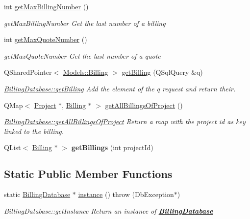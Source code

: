 \begin{DoxyCompactItemize}
int \hyperlink{classDatabases_1_1BillingDatabase_a57e4b68cac145ba400d408698312599b}{get\-Max\-Billing\-Number} ()
\begin{DoxyCompactList}\small\item\em get\-Max\-Billing\-Number Get the last number of a billing \end{DoxyCompactList}\item 
int \hyperlink{classDatabases_1_1BillingDatabase_a91704d31741279aacf9a9903b7ebcbf5}{get\-Max\-Quote\-Number} ()
\begin{DoxyCompactList}\small\item\em get\-Max\-Quote\-Number Get the last number of a quote \end{DoxyCompactList}\item 
Q\-Shared\-Pointer$<$ \hyperlink{classModels_1_1Billing}{Models\-::\-Billing} $>$ \hyperlink{classDatabases_1_1BillingDatabase_a2e6c6cd8b3b040eeb7fc6ae727e85013}{get\-Billing} (Q\-Sql\-Query \&q)
\begin{DoxyCompactList}\small\item\em \hyperlink{classDatabases_1_1BillingDatabase_a835d4ca35a046fe1d0b336a1b8cf8f85}{Billing\-Database\-::get\-Billing} Add the element of the {\itshape q} request and return their. \end{DoxyCompactList}\item 
Q\-Map$<$ \hyperlink{classModels_1_1Project}{Project} $\ast$, \hyperlink{classModels_1_1Billing}{Billing} $\ast$ $>$ \hyperlink{classDatabases_1_1BillingDatabase_a44c3e09fbb7d540579f4cceae4d6901f}{get\-All\-Billings\-Of\-Project} ()
\begin{DoxyCompactList}\small\item\em \hyperlink{classDatabases_1_1BillingDatabase_a44c3e09fbb7d540579f4cceae4d6901f}{Billing\-Database\-::get\-All\-Billings\-Of\-Project} Return a map with the project id as key linked to the billing. \end{DoxyCompactList}\item 
\hypertarget{classDatabases_1_1BillingDatabase_a97aec0837c32d1dcac72965c38389451}{Q\-List$<$ \hyperlink{classModels_1_1Billing}{Billing} $\ast$ $>$ {\bfseries get\-Billings} (int project\-Id)}\label{classDatabases_1_1BillingDatabase_a97aec0837c32d1dcac72965c38389451}

\end{DoxyCompactItemize}
\subsection*{Static Public Member Functions}
\begin{DoxyCompactItemize}
\item 
static \hyperlink{classDatabases_1_1BillingDatabase}{Billing\-Database} $\ast$ \hyperlink{classDatabases_1_1BillingDatabase_aee84d7d07ff4a25251c61030019e5abb}{instance} ()  throw (\-Db\-Exception$\ast$)
\begin{DoxyCompactList}\small\item\em Billing\-Database\-::get\-Instance Return an instance of {\bfseries \hyperlink{classDatabases_1_1BillingDatabase}{Billing\-Database}} \end{DoxyCompactList}\end{DoxyCompactItemize}

